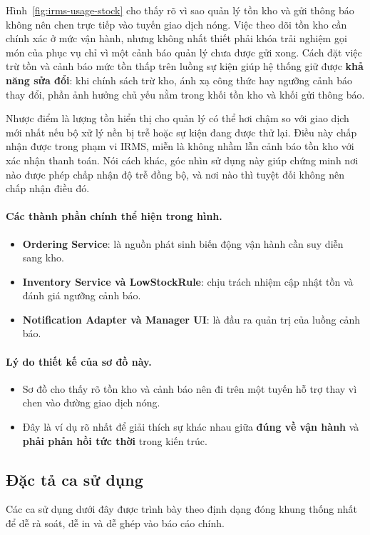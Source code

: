 \documentclass[11pt,a4paper]{article}
\begin{document}
Hình~\ref{fig:irms-usage-stock} cho thấy rõ vì sao quản lý tồn kho và gửi thông báo không nên chen trực tiếp vào tuyến giao dịch nóng.
Việc theo dõi tồn kho cần chính xác ở mức vận hành,
nhưng không nhất thiết phải khóa trải nghiệm gọi món của phục vụ
chỉ vì một cảnh báo quản lý chưa được gửi xong.
Cách đặt việc trừ tồn và cảnh báo mức tồn thấp trên luồng sự kiện
giúp hệ thống giữ được \textbf{khả năng sửa đổi}:
khi chính sách trừ kho, ánh xạ công thức hay ngưỡng cảnh báo thay đổi,
phần ảnh hưởng chủ yếu nằm trong khối tồn kho và khối gửi thông báo.

Nhược điểm là lượng tồn hiển thị cho quản lý có thể hơi chậm so với giao dịch mới nhất
nếu bộ xử lý nền bị trễ hoặc sự kiện đang được thử lại.
Điều này chấp nhận được trong phạm vi IRMS,
miễn là không nhầm lẫn cảnh báo tồn kho với xác nhận thanh toán.
Nói cách khác, góc nhìn sử dụng này giúp chứng minh nơi nào được phép chấp nhận độ trễ đồng bộ,
và nơi nào thì tuyệt đối không nên chấp nhận điều đó.

\paragraph{Các thành phần chính thể hiện trong hình.}
\begin{itemize}
  \item \textbf{Ordering Service}: là nguồn phát sinh biến động vận hành cần suy diễn sang kho.
  \item \textbf{Inventory Service và LowStockRule}: chịu trách nhiệm cập nhật tồn và đánh giá ngưỡng cảnh báo.
  \item \textbf{Notification Adapter và Manager UI}: là đầu ra quản trị của luồng cảnh báo.
\end{itemize}

\paragraph{Lý do thiết kế của sơ đồ này.}
\begin{itemize}
  \item Sơ đồ cho thấy rõ tồn kho và cảnh báo nên đi trên một tuyến hỗ trợ thay vì chen vào đường giao dịch nóng.
  \item Đây là ví dụ rõ nhất để giải thích sự khác nhau giữa \textbf{đúng về vận hành} và \textbf{phải phản hồi tức thời} trong kiến trúc.
\end{itemize}

\subsection{Đặc tả ca sử dụng}
Các ca sử dụng dưới đây được trình bày theo định dạng đóng khung thống nhất để dễ rà soát, dễ in và dễ ghép vào báo cáo chính.
\end{document}
